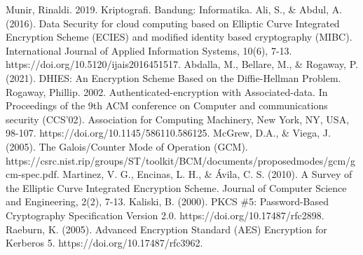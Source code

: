 \documentclass[conference]{IEEEtran}
\begin{document}
\begin{thebibliography}{00}
     Munir, Rinaldi. 2019. Kriptografi. Bandung: Informatika.
     Ali, S., \& Abdul, A. (2016). Data Security for cloud computing based on Elliptic Curve Integrated Encryption Scheme (ECIES) and modified identity based cryptography (MIBC). International Journal of Applied Information Systems, 10(6), 7-13. https://doi.org/10.5120/ijais2016451517.
     Abdalla, M., Bellare, M., \& Rogaway, P. (2021). DHIES: An Encryption Scheme Based on the Diffie-Hellman Problem.
     Rogaway, Phillip. 2002. Authenticated-encryption with Associated-data. In Proceedings of the 9th ACM conference on Computer and communications security (CCS'02). Association for Computing Machinery, New York, NY, USA, 98-107. https://doi.org/10.1145/586110.586125.
     McGrew, D.A., \& Viega, J. (2005). The Galois/Counter Mode of Operation (GCM). https://csrc.nist.rip/groups/ST/toolkit/BCM/documents/proposedmodes/gcm/gcm-spec.pdf.
     Martinez, V. G., Encinas, L. H., \& Ávila, C. S. (2010). A Survey of the Elliptic Curve Integrated Encryption Scheme. Journal of Computer Science and Engineering, 2(2), 7-13. 
     Kaliski, B. (2000). PKCS \#5: Password-Based Cryptography Specification Version 2.0. https://doi.org/10.17487/rfc2898.
     Raeburn, K. (2005). Advanced Encryption Standard (AES) Encryption for Kerberos 5. https://doi.org/10.17487/rfc3962.
\end{thebibliography}
\end{document}
